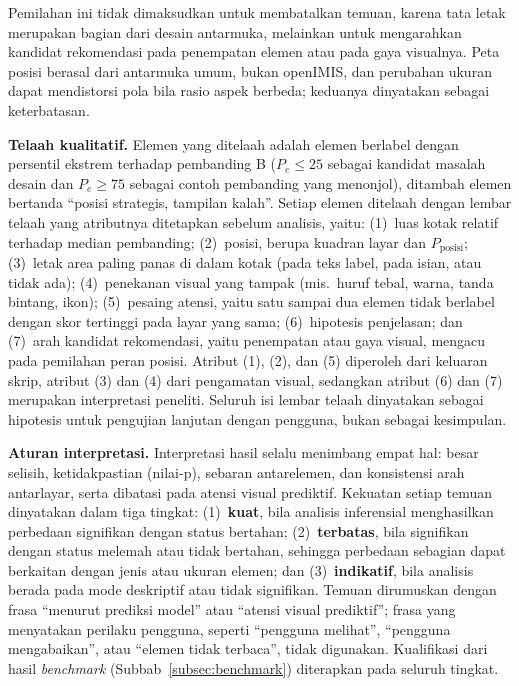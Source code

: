 Pemilahan ini tidak dimaksudkan untuk membatalkan temuan, karena tata letak merupakan bagian dari desain antarmuka, melainkan untuk mengarahkan kandidat rekomendasi pada penempatan elemen atau pada gaya visualnya. Peta posisi berasal dari antarmuka umum, bukan openIMIS, dan perubahan ukuran dapat mendistorsi pola bila rasio aspek berbeda; keduanya dinyatakan sebagai keterbatasan.

\textbf{Telaah kualitatif.} Elemen yang ditelaah adalah elemen berlabel dengan persentil ekstrem terhadap pembanding B ($P_e \leq 25$ sebagai kandidat masalah desain dan $P_e \geq 75$ sebagai contoh pembanding yang menonjol), ditambah elemen bertanda ``posisi strategis, tampilan kalah''. Setiap elemen ditelaah dengan lembar telaah yang atributnya ditetapkan sebelum analisis, yaitu: (1)~luas kotak relatif terhadap median pembanding; (2)~posisi, berupa kuadran layar dan $P_{\text{posisi}}$; (3)~letak area paling panas di dalam kotak (pada teks label, pada isian, atau tidak ada); (4)~penekanan visual yang tampak (mis.\ huruf tebal, warna, tanda bintang, ikon); (5)~pesaing atensi, yaitu satu sampai dua elemen tidak berlabel dengan skor tertinggi pada layar yang sama; (6)~hipotesis penjelasan; dan (7)~arah kandidat rekomendasi, yaitu penempatan atau gaya visual, mengacu pada pemilahan peran posisi. Atribut (1), (2), dan (5) diperoleh dari keluaran skrip, atribut (3) dan (4) dari pengamatan visual, sedangkan atribut (6) dan (7) merupakan interpretasi peneliti. Seluruh isi lembar telaah dinyatakan sebagai hipotesis untuk pengujian lanjutan dengan pengguna, bukan sebagai kesimpulan.

\textbf{Aturan interpretasi.} Interpretasi hasil selalu menimbang empat hal: besar selisih, ketidakpastian (nilai-p), sebaran antarelemen, dan konsistensi arah antarlayar, serta dibatasi pada atensi visual prediktif. Kekuatan setiap temuan dinyatakan dalam tiga tingkat: (1)~\textbf{kuat}, bila analisis inferensial menghasilkan perbedaan signifikan dengan status bertahan; (2)~\textbf{terbatas}, bila signifikan dengan status melemah atau tidak bertahan, sehingga perbedaan sebagian dapat berkaitan dengan jenis atau ukuran elemen; dan (3)~\textbf{indikatif}, bila analisis berada pada mode deskriptif atau tidak signifikan. Temuan dirumuskan dengan frasa ``menurut prediksi model'' atau ``atensi visual prediktif''; frasa yang menyatakan perilaku pengguna, seperti ``pengguna melihat'', ``pengguna mengabaikan'', atau ``elemen tidak terbaca'', tidak digunakan. Kualifikasi dari hasil \emph{benchmark} (Subbab~\ref{subsec:benchmark}) diterapkan pada seluruh tingkat.

